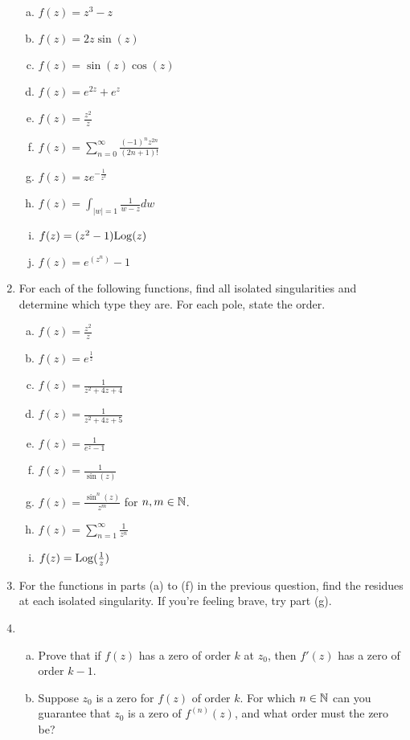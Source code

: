 \begin{enumerate}
\begin{enumerate}[a)] 
\item $f(z) = z^3 - z$
\item $f(z) = 2z\sin(z)$
\item $f(z) = \sin(z)\cos(z)$
\item $f(z) = e^{2z} + e^z$
\item $f(z) = \frac{z^2}{z}$
\item $f(z) = \sum_{n =0}^\infty \frac{(-1)^n z^{2n}}{(2n+1)!}$
\item $f(z) = ze^{-\frac{1}{z^2}}$
\item $f(z) = \int_{|w| =1} \frac{1}{w-z}dw$
\item $f(z) = (z^2-1)\mathrm{Log}(z)$
\item $f(z) = e^{(z^n)} - 1$
\end{enumerate}

\item For each of the following functions, find all isolated singularities and determine which type they are. For each pole, state the order.

\begin{enumerate}[a)] 
\item $f(z) = \frac{z^2}{z}$
\item $f(z) = e^{\frac{1}{z}}$
\item $f(z) = \frac{1}{z^2 + 4z + 4}$
\item $f(z) = \frac{1}{z^2 + 4z + 5}$
\item $f(z) = \frac{1}{e^z - 1}$
\item $f(z) = \frac{1}{\sin(z)}$
\item $f(z) = \frac{\sin^n(z)}{z^m}$ for $n,m\in \mathbb{N}$.
\item $f(z) = \sum_{n = 1}^\infty \frac{1}{z^n}$
\item $f(z) = \mathrm{Log}(\frac{1}{z})$
\end{enumerate}

\item For the functions in parts (a) to (f) in the previous question, find the residues at each isolated singularity. If you're feeling brave, try part (g).

\item \begin{enumerate}[a)] \item Prove that if $f(z)$ has a zero of order $k$ at $z_0$, then $f'(z)$ has a zero of order $k-1$. 

\item Suppose $z_0$ is a zero for $f(z)$ of order $k$. For which $n \in\mathbb{N}$ can you guarantee that $z_0$ is a zero of $f^{(n)}(z)$, and what order must the zero be?


\end{enumerate}
\end{enumerate}
